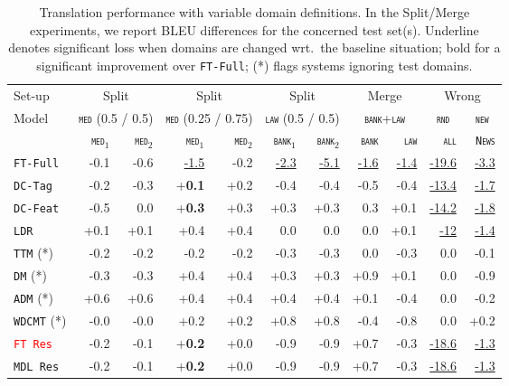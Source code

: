 \documentclass[11pt,a4paper]{article}
\newcommand{\fyDone}[1]{\done[FY]\Todo[FY:]{\textcolor{orange}{#1}}}
\newcommand{\revision}[1]{\textcolor{red}{#1}}
\newcommand{\domain}[1]{\texttt{\textsc{#1}}}
\newcommand{\system}[1]{\texttt{{#1}}}
\newcommand{\SB}[1]{\textbf{#1}}
\newcommand{\SW}[1]{\underline{#1}}
\begin{document}
\begin{table*}
  \centering%
  \begin{tabular}{|p{1.8cm}|*{10}{r|}} \hline
    \hfill Set-up & \multicolumn{2}{c|}{Split} &  \multicolumn{2}{c|}{Split} & \multicolumn{2}{c|}{Split} & \multicolumn{2}{c|}{Merge} & \multicolumn{2}{c|}{Wrong} \\ %
     Model \hfill & \multicolumn{2}{c|}{\domain{med} \footnotesize{(0.5 / 0.5)}} &  \multicolumn{2}{c|}{\domain{med} {\footnotesize (0.25 / 0.75)}} & \multicolumn{2}{c|}{\domain{law} {\footnotesize (0.5 / 0.5)}} & \multicolumn{2}{c|}{\domain{bank}+\domain{law}} &  \multicolumn{1}{c|}{\domain{rnd}} &  \multicolumn{1}{c|}{\domain{new}}\\ \hline
    & \domain{med}$_1$ & \domain{med}$_2$ & \domain{med}$_1$ & \domain{med}$_2$ &  \domain{bank}$_1$ & \domain{bank}$_2$ & \domain{bank} & \domain{law}   & \domain{all} & \domain{News} \\
    \system{FT-Full}      & -0.1 & -0.6 & \SW{-1.5} & -0.2& \SW{-2.3} & \SW{-5.1} &\SW{-1.6} & \SW{-1.4}& \SW{-19.6} & \SW{-3.3}\\%
    \system{DC-Tag}     & -0.2 & -0.3& +\SB{0.1}  & +0.2& -0.4 & -0.4 & -0.5 & -0.4 & \SW{-13.4} & \SW{-1.7}\\%
    \system{DC-Feat}    & -0.5 & 0.0 & +\SB{0.3}   & +0.3 & +0.3 & +0.3 & 0.3 & +0.1 & \SW{-14.2} &\SW{-1.8}\\ %
    \system{LDR}           & +0.1 & +0.1 & +0.4 & +0.4 & 0.0 &  0.0 &  0.0 & +0.1& \SW{-12} & \SW{-1.4}\\ %
    \system{TTM} (*)        & -0.2 &  -0.2 & -0.2 & -0.2 & -0.3 &-0.3 &  0.0 & -0.3 & 0.0 & -0.1\\
    \system{DM} (*)           & -0.3   & -0.3  & +0.4 & +0.4 & +0.3 & +0.3 & +0.9 & +0.1 & 0.0 &-0.9\\
    \system{ADM} (*)        & +0.6   & +0.6 & +0.4 & +0.4 & +0.4 & +0.4 &  +0.1 & -0.4 & 0.0&-0.2\\
    \system{WDCMT} (*)     & -0.0    & -0.0  & +0.2 & +0.2  & +0.8 & +0.8  & -0.4 & -0.8 & 0.0 & +0.2 \\
    \revision{\system{FT Res}}   & -0.2   & -0.1 & +\SB{0.2} &+0.0 & -0.9 & -0.9 & +0.7 & -0.3 & \SW{-18.6} & \SW{-1.3}\\ %
    \system{MDL Res}   & -0.2   & -0.1 & +\SB{0.2} &+0.0 & -0.9 & -0.9 & +0.7 & -0.3 & \SW{-18.6} & \SW{-1.3}\\ %
    \hline
  \end{tabular}
  \caption{Translation performance with variable domain definitions. In the Split/Merge experiments, we report BLEU differences for the concerned test set(s). Underline denotes significant loss when domains are changed wrt.\ the baseline situation; bold for a significant improvement over \system{FT-Full}; (*) flags systems ignoring test domains.
    \fyDone{Check wrong and significance of diff for ``old''}\fyDone{How about wrong ?}
  }
  \label{tab:redomains}
\end{table*}
\end{document}

